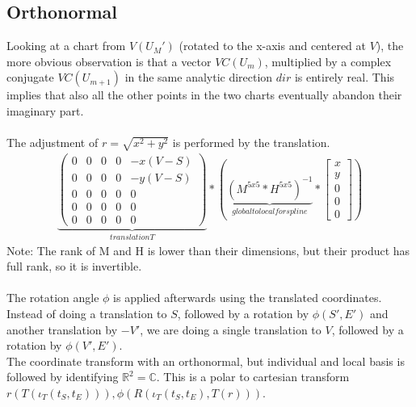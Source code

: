 \documentclass{report}
\begin{document}
\subsection{Orthonormal}
Looking at a chart from $V(U_{M}')$ (rotated to the x-axis and centered at $V$), the more obvious observation is that a vector $VC(U_{m})$, multiplied by a complex conjugate $VC(U_{m+1})$ in the same analytic direction $dir$ is entirely real. This implies that also all the other points in the two charts eventually abandon their imaginary part.\\\\
The adjustment of $r=\sqrt{x^2+y^2}$ is performed by the translation.
\begin{align}
\underbrace{
\begin{pmatrix}
0 & 0 & 0 & 0 & -x(V-S) \\
0 & 0 & 0 & 0 & -y(V-S) \\
0 & 0 & 0 & 0 & 0 \\
0 & 0 & 0 & 0 & 0 \\
0 & 0 & 0 & 0 & 0
\end{pmatrix}
}_{translation T}
*(
\underbrace{
(M^{5x5} * H^{5x5})^{-1}
}_{global to local for spline}
*\begin{bmatrix} x \\ y \\ 0 \\ 0 \\ 0 \end{bmatrix})
\end{align}
Note: The rank of M and H is lower than their dimensions, but their product has full rank, so it is invertible.\\\\
The rotation angle $\phi$ is applied afterwards using the translated coordinates. Instead of doing a translation to $S$, followed by a rotation by $\phi(S',E')$ and another translation by $-V'$, we are doing a single translation to $V$, followed by a rotation by $\phi(V',E')$.\\
The coordinate transform with an orthonormal, but individual and local basis is followed by identifying $\mathbb{R}^2=\mathbb{C}$. This is a polar to cartesian transform $r(T(\iota_{T}(t_{S},t_{E}))),\phi(R(\iota_{T}(t_{S},t_{E}),T(r)))$.
\end{document}
